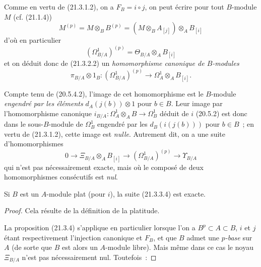 \begin{env}[21.3.3]
\label{0.21.3.3-fr}
Comme en vertu de (21.3.1.2), on a $F_B=i\circ j$, on peut écrire pour
tout $B$-module $M$ (cf. (21.1.4))
\begin{equation}
\tag{21.3.3.1}\label{0.21.3.3.1-fr}
M^{(p)}=M\otimes_B B^{(p)}=(M\otimes_B A_{[j]})\otimes_A B_{[i]}
\end{equation}
d'où en particulier
\begin{equation}
\tag{21.3.3.2}\label{0.21.3.3.2-fr}
(\Omega^1_{B/A})^{(p)}=\Theta_{B/A}\otimes_A B_{[i]}
\end{equation}
et on déduit donc de (21.3.2.2) un \emph{homomorphisme canonique de $B$-modules}
\begin{equation}
\tag{21.3.3.3}\label{0.21.3.3.3-fr}
\pi_{B/A}\otimes1_B:(\Omega^1_{B/A})^{(p)}\longrightarrow
\Omega^1_A\otimes_A B_{[i]}.
\end{equation}

Compte tenu de (20.5.4.2), l'image de cet homomorphisme est le $B$-module
\emph{engendré par les éléments} $d_A(j(b))\otimes1$ pour $b\in B$. Leur image
par l'homomorphisme canonique $i_{B/A}:\Omega^1_A\otimes_A B\to\Omega^1_B$
déduit de $i$ (20.5.2) est donc dans le sous-$B$-module de $\Omega^1_B$
engendré par les $d_B(i(j(b)))$ pour $b\in B$~; en vertu de (21.3.1.2),
cette image est \emph{nulle}. Autrement dit, on a une suite d'homomorphismes
\begin{equation}
\tag{21.3.3.4}\label{0.21.3.3.4-fr}
0\to\Xi_{B/A}\otimes_A B_{[i]}\to(\Omega^1_{B/A})^{(p)}
\to\Upsilon_{B/A}
\end{equation}
qui n'est pas nécessairement exacte, mais où le composé de deux
homomorphismes consécutifs est \emph{nul}.
\end{env}

\begin{proposition}[21.3.4]
\label{0.21.3.4-fr}
Si $B$ est un $A$-module plat (pour $i$), la suite (21.3.3.4) est exacte.
\end{proposition}
\begin{proof}
Cela résulte de la définition de la platitude.

La proposition (21.3.4) s'applique en
particulier lorsque l'on a $B^p\subset A\subset B$, $i$ et $j$ étant respectivement
l'injection canonique et $F_B$, et que $B$ admet une \emph{$p$-base} sur $A$ (de sorte
que $B$ est alors un $A$-module libre). Mais même dans ce cas le noyau
$\Xi_{B/A}$ n'est pas nécessairement nul. Toutefois~:
\end{proof}

